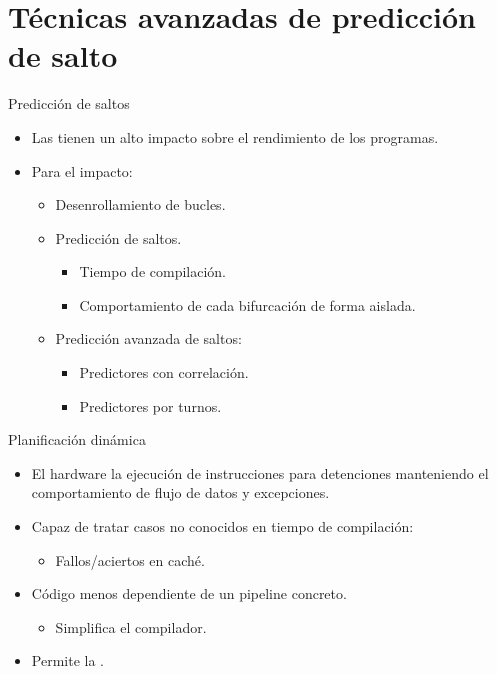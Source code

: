 \section{Técnicas avanzadas de predicción de salto}

\begin{frame}[t]{Predicción de saltos}
\begin{itemize}
  \item Las  tienen un alto impacto sobre 
        el rendimiento de los programas.

  \item Para  el impacto:
    \begin{itemize}
      \item Desenrollamiento de bucles.
      \item Predicción de saltos.
        \begin{itemize}
          \item Tiempo de compilación.
          \item Comportamiento de cada bifurcación de forma aislada.
        \end{itemize}
      \item Predicción avanzada de saltos:
        \begin{itemize}
          \item Predictores con correlación.
          \item Predictores por turnos.
        \end{itemize}
    \end{itemize}
\end{itemize}
\end{frame}

\begin{frame}[t]{Planificación dinámica}
\begin{itemize}
  \item El hardware  la ejecución de instrucciones para
         detenciones manteniendo el comportamiento de flujo de
        datos y excepciones.

  \item Capaz de tratar casos no conocidos en tiempo de compilación:
    \begin{itemize}
      \item Fallos/aciertos en caché.
    \end{itemize}

  \item Código menos dependiente de un pipeline concreto.
    \begin{itemize}
      \item Simplifica el compilador.
    \end{itemize}

  \item Permite la .

\end{itemize}
\end{frame}

